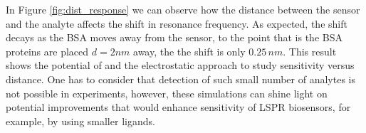 In Figure \ref{fig:dist_response} we can observe how the distance between the sensor 
and the analyte affects the shift in resonance frequency. As expected, the shift decays 
as the BSA moves away from the sensor, to the point that is the BSA proteins are placed
$d=2 nm$ away, the the shift is only $0.25 \, nm$. This result shows the potential of \pygbe 
and the electrostatic approach to study sensitivity versus distance.
One has to consider that detection of such
small number of analytes is not possible in experiments, however, these simulations can shine light on
potential improvements that would enhance sensitivity of LSPR biosensors, for example, by using
smaller ligands. 




